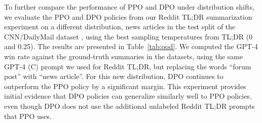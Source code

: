\documentclass{article}
\begin{document}
To further compare the performance of PPO and DPO under distribution shifts, we evaluate the PPO and DPO policies from our Reddit TL;DR summarization experiment on a different distribution, news articles in the test split of the CNN/DailyMail dataset \citep{nallapati-etal-2016-abstractive}, using the best sampling temperatures from TL;DR (0 and 0.25). The results are presented in Table~\ref{tab:ood}. We computed the GPT-4 win rate against the ground-truth summaries in the datasets, using the same GPT-4 (C) prompt we used for Reddit TL;DR, but replacing the words ``forum post'' with ``news article''. For this new distribution, DPO continues to outperform the PPO policy by a significant margin. This experiment provides initial evidence that DPO policies can generalize similarly well to PPO policies, even though DPO does not use the additional unlabeled Reddit TL;DR prompts that PPO uses.
\end{document}
